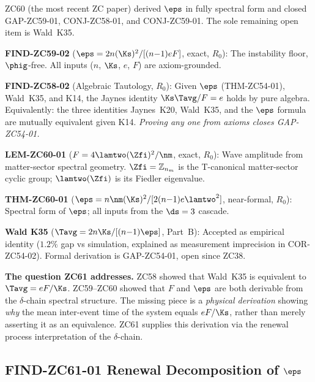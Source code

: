 \documentclass[12pt, a4paper]{article}
\begin{document}
\begin{keybox}[title={What ZC60 Left Open --- Full Inheritance}]
ZC60 (the most recent ZC paper) derived $\eps$ in fully spectral
form and closed GAP-ZC59-01, CONJ-ZC58-01, and CONJ-ZC59-01.
The sole remaining open item is Wald~K35.

\medskip
\textbf{FIND-ZC59-02} ($\eps = 2n(\Ks)^2/[(n{-}1)eF]$, exact, $R_0$):
The instability floor, $\phig$-free.
All inputs ($n$, $\Ks$, $e$, $F$) are axiom-grounded.

\medskip
\textbf{FIND-ZC58-02} (Algebraic Tautology, $R_0$):
Given $\eps$ (THM-ZC54-01), Wald~K35, and K14, the Jaynes
identity $\Ks\Tavg/F = e$ holds by pure algebra.
Equivalently: the three identities Jaynes~K20, Wald~K35,
and the $\eps$ formula are mutually equivalent given K14.
\emph{Proving any one from axioms closes GAP-ZC54-01.}

\medskip
\textbf{LEM-ZC60-01} ($F = 4\lamtwo(\Zfi)^2/\nm$, exact, $R_0$):
Wave amplitude from matter-sector spectral geometry.
$\Zfi = \mathbb{Z}_{n_m}$ is the T-canonical matter-sector
cyclic group; $\lamtwo(\Zfi)$ is its Fiedler eigenvalue.

\medskip
\textbf{THM-ZC60-01} ($\eps = n\nm(\Ks)^2/[2(n{-}1)e\lamtwo^2]$,
near-formal, $R_0$): Spectral form of $\eps$; all inputs
from the $\ds=3$ cascade.

\medskip
\textbf{Wald K35} ($\Tavg = 2n\Ks/[(n{-}1)\eps]$, Part~B):
Accepted as empirical identity ($1.2\%$ gap vs simulation,
explained as measurement imprecision in COR-ZC54-02).
Formal derivation is GAP-ZC54-01, open since ZC38.

\medskip
\textbf{The question ZC61 addresses.}
ZC58 showed that Wald~K35 is equivalent to $\Tavg = eF/\Ks$.
ZC59--ZC60 showed that $F$ and $\eps$ are both derivable from
the $\delta$-chain spectral structure.
The missing piece is a \emph{physical derivation} showing
\emph{why} the mean inter-event time of the system equals
$eF/\Ks$, rather than merely asserting it as an equivalence.
ZC61 supplies this derivation via the renewal process
interpretation of the $\delta$-chain.
\end{keybox}

\subsection{FIND-ZC61-01 \quad Renewal Decomposition of $\eps$}
\label{sec:find01}
\end{document}
